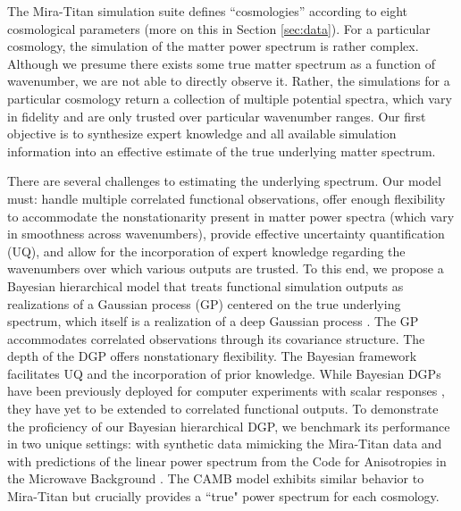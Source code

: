 \documentclass[11pt]{article}
\begin{document}
The Mira-Titan simulation suite \citep{moran2023mira}
defines ``cosmologies'' according to eight cosmological parameters (more on this
in Section \ref{sec:data}).  For a particular cosmology, the simulation of the matter power spectrum 
is rather complex.  Although we presume there exists some true matter spectrum as a function
of wavenumber, we are not able to directly observe it.  Rather, the simulations for a 
particular cosmology return a collection of multiple potential spectra, 
which vary in fidelity and are only trusted over particular wavenumber ranges.  
Our first objective is to synthesize expert knowledge and all available 
simulation information into an effective estimate of the true underlying
matter spectrum.

There are several challenges to estimating the underlying spectrum.  Our model
must: handle multiple correlated functional observations, offer enough 
flexibility to accommodate the nonstationarity present in matter power spectra 
(which vary in smoothness across wavenumbers), provide effective uncertainty
quantification (UQ), and allow for the incorporation of expert knowledge 
regarding the wavenumbers over which various outputs are trusted.  To this end, 
we propose a Bayesian hierarchical model that treats functional simulation 
outputs as realizations of a Gaussian process (GP) 
centered on the true underlying spectrum, which itself is a realization of a deep Gaussian process 
\citep[DGP;][]{damianou2013deep}.  The GP accommodates correlated observations
through its covariance structure.  The depth of the DGP offers nonstationary
flexibility.  The Bayesian framework facilitates UQ and the incorporation of prior
knowledge.  While Bayesian DGPs have been previously deployed for computer experiments 
with scalar responses \citep[e.g.,][]{sauer2023active,sauer2023vecchia,ming2023deep}, 
they have yet to be extended to correlated functional outputs. 
To demonstrate the proficiency of our Bayesian hierarchical DGP, 
we benchmark its performance in two unique settings: with synthetic data 
mimicking the Mira-Titan data and with predictions of the linear power spectrum from 
the Code for Anisotropies in the Microwave Background \citep[CAMB;][]{lewis2011CAMB}.
The CAMB model exhibits similar behavior to Mira-Titan but crucially
provides a ``true" power spectrum for each cosmology.
\end{document}

